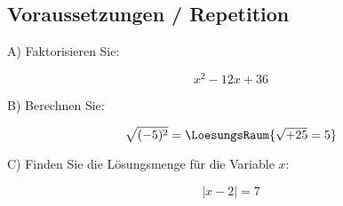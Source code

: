 

\subsection{Voraussetzungen / Repetition}

A) Faktorisieren Sie:

$$x^2-12x+36$$


B) Berechnen Sie:

$$\sqrt{(-5)^2} = \LoesungsRaum{\sqrt{+25} = 5}$$


C) Finden Sie die Lösungsmenge für die Variable $x$:

$$|x-2| = 7$$



\newpage
